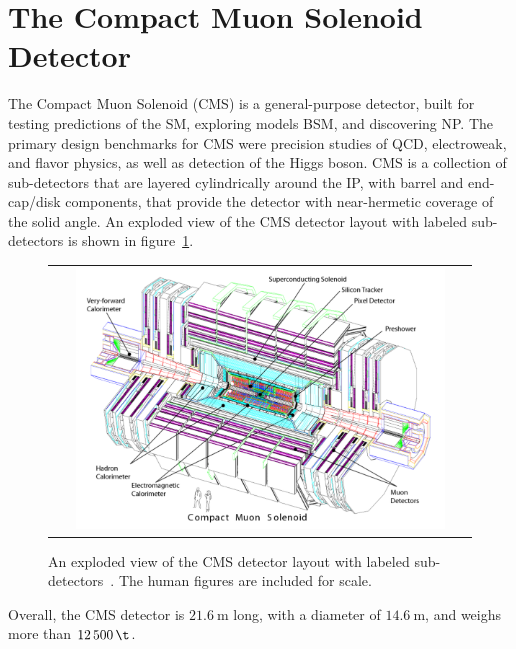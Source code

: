 \section{The Compact Muon Solenoid Detector}
The Compact Muon Solenoid (CMS) is a general-purpose detector, built for testing predictions of the SM, exploring models BSM, and discovering NP.
The primary design benchmarks for CMS were precision studies of QCD, electroweak, and flavor physics, as well as detection of the Higgs boson.
CMS is a collection of sub-detectors that are layered cylindrically around the IP, with barrel and end-cap/disk components, that provide the detector with near-hermetic coverage of the solid angle.
An exploded view of the CMS detector layout with labeled sub-detectors is shown in figure~\ref{CMS_Detector}.
\begin{figure}[!h]
  \begin{center}
    \begin{tabular}{c}
        \includegraphics[width=0.9\textwidth]{fig_LHC_CMS/CMS_Detector.pdf}
    \end{tabular}
    \caption{An exploded view of the CMS detector layout with labeled sub-detectors~\cite{Bayatian:922757}.
            The human figures are included for scale.
            }
    \label{CMS_Detector}
  \end{center}
\end{figure}
Overall, the CMS detector is $\SI{21.6}{\m}$ long, with a diameter of $\SI{14.6}{\m}$, and weighs more than $\SI{12500}{\t}$.

